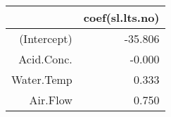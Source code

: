 \begin{table}[ht]
\centering
\begin{tabular}{rr}
  \hline
 & coef(sl.lts.no) \\ 
  \hline
(Intercept) & -35.806 \\ 
  Acid.Conc. & -0.000 \\ 
  Water.Temp & 0.333 \\ 
  Air.Flow & 0.750 \\ 
   \hline
\end{tabular}
\end{table}
